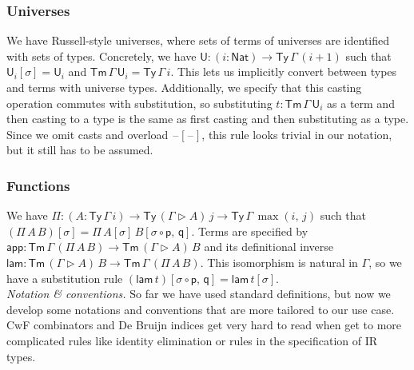 \documentclass[acmsmall,screen,review,anonymous]{acmart}
\newcommand{\msf}[1]{{\mathsf{#1}}}
\newcommand{\p}{\mathsf{p}}
\newcommand{\q}{\mathsf{q}}
\newcommand{\U}{\msf{U}}
\newcommand{\Nat}{\msf{Nat}}
\newcommand{\blank}{{\mathord{\hspace{1pt}\text{--}\hspace{1pt}}}}
\newcommand{\id}{\msf{id}}
\newcommand{\Ty}{\msf{Ty}}
\newcommand{\Tm}{\msf{Tm}}
\newcommand{\ext}{\triangleright}
\newcommand{\lam}{\msf{lam}}
\newcommand{\app}{\msf{app}}
\newcommand{\bapp}{\$}
\newcommand{\fun}{\Rightarrow}
\begin{document}
\subsubsection{Universes} We have Russell-style universes, where sets of terms of universes are identified with sets of types.
Concretely, we have $\U : (i : \Nat) \to \Ty\,\Gamma\,(i + 1)$ such that $\U_i[\sigma] = \U_i$ and
$\Tm\,\Gamma\,\U_i = \Ty\,\Gamma\,i$.  This lets us implicitly convert between types and terms with
universe types. Additionally, we specify that this casting operation commutes with substitution, so
substituting $t : \Tm\,\Gamma\,\U_i$ as a term and then casting to a type is the same as first
casting and then substituting as a type. Since we omit casts and overload $\blank[\blank]$, this
rule looks trivial in our notation, but it still has to be assumed.

\subsubsection{Functions} We have $\Pi : (A : \Ty\,\Gamma\,i) \to \Ty\,(\Gamma \ext A)\,j \to \Ty\,\Gamma\,\max(i,\,j)$
such that $(\Pi\,A\,B)[\sigma] = \Pi\,A[\sigma]\,B[\sigma\circ\p,\,\q]$.  Terms are specified by
$\app : \Tm\,\Gamma\,(\Pi\,A\,B) \to \Tm\,(\Gamma\ext A)\,B$ and its definitional inverse $\lam :
\Tm\,(\Gamma\ext A)\,B \to \Tm\,\Gamma\,(\Pi\,A\,B)$. This isomorphism is natural in $\Gamma$, so we
have a substitution rule $(\lam\,t)[\sigma\circ\p,\,\q] = \lam\,t[\sigma]$.
\\


\emph{Notation \& conventions.} So far we have used standard definitions, but now we develop some
notations and conventions that are more tailored to our use case. CwF combinators and De Bruijn
indices get very hard to read when get to more complicated rules like identity elimination or rules
in the specification of IR types.
\end{document}
